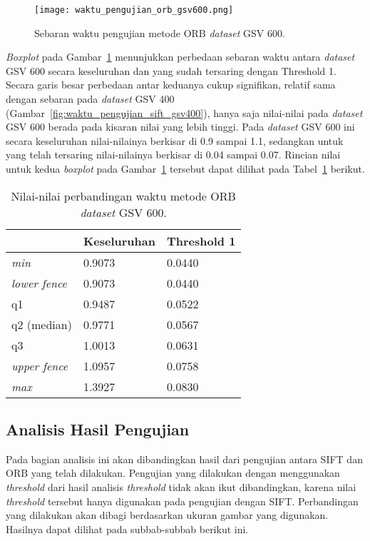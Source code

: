 \begin{figure}[H]
	\centering
	\texttt{[image: waktu\_pengujian\_orb\_gsv600.png]}
	\caption{Sebaran waktu pengujian metode ORB \textit{dataset} GSV 600.}
	\label{fig:waktu_pengujian_orb_gsv600}
\end{figure}

\textit{Boxplot} pada Gambar~\ref{fig:waktu_pengujian_orb_gsv600} menunjukkan perbedaan sebaran waktu antara \textit{dataset} GSV 600 secara keseluruhan dan yang sudah tersaring dengan Threshold 1. Secara garis besar perbedaan antar keduanya cukup signifikan, relatif sama dengan sebaran pada \textit{dataset} GSV 400 (Gambar~\ref{fig:waktu_pengujian_sift_gsv400}), hanya saja nilai-nilai pada \textit{dataset} GSV 600 berada pada kisaran nilai yang lebih tinggi. Pada \textit{dataset} GSV 600 ini secara keseluruhan nilai-nilainya berkisar di 0.9 sampai 1.1, sedangkan untuk yang telah tersaring nilai-nilainya berkisar di 0.04 sampai 0.07. Rincian nilai untuk kedua \textit{boxplot} pada Gambar~\ref{fig:waktu_pengujian_orb_gsv600} tersebut dapat dilihat pada Tabel~\ref{tab:boxplot_gsv600_orb} berikut.
\begin{table}[H]
	\centering
	\begin{tabular}{|l|l|l|}
		\hline
		& \textbf{Keseluruhan} & \textbf{Threshold 1}         \\ \hline
		\textit{min}          & 0.9073 & 0.0440               \\ \hline
		\textit{lower fence}  & 0.9073 & 0.0440               \\ \hline
		q1                    & 0.9487 & 0.0522               \\ \hline
		q2 (median)           & 0.9771 & 0.0567               \\ \hline
		q3                    & 1.0013 & 0.0631               \\ \hline
		\textit{upper fence}  & 1.0957 & 0.0758               \\ \hline
		\textit{max}          & 1.3927 & 0.0830               \\ \hline
	\end{tabular}
	\caption{Nilai-nilai perbandingan waktu metode ORB \textit{dataset} GSV 600.}
	\label{tab:boxplot_gsv600_orb}
\end{table}

\subsection{Analisis Hasil Pengujian}
Pada bagian analisis ini akan dibandingkan hasil dari pengujian antara SIFT dan ORB yang telah dilakukan. Pengujian yang dilakukan dengan menggunakan \textit{threshold} dari hasil analisis \textit{threshold} tidak akan ikut dibandingkan, karena nilai \textit{threshold} tersebut hanya digunakan pada pengujian dengan SIFT. Perbandingan yang dilakukan akan dibagi berdasarkan ukuran gambar yang digunakan. Hasilnya dapat dilihat pada subbab-subbab berikut ini.

